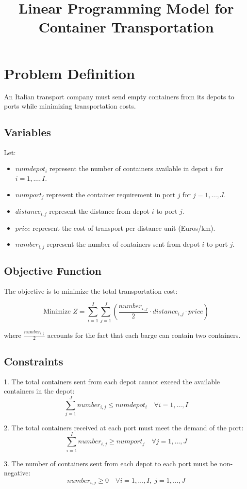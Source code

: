 \documentclass{article}
\begin{document}
\title{Linear Programming Model for Container Transportation}
\author{}
\date{}
\maketitle

\section*{Problem Definition}

An Italian transport company must send empty containers from its depots to ports while minimizing transportation costs. 

\subsection*{Variables}
Let:
\begin{itemize}
    \item \( numdepot_i \) represent the number of containers available in depot \( i \) for \( i = 1, \ldots, I \).
    \item \( numport_j \) represent the container requirement in port \( j \) for \( j = 1, \ldots, J \).
    \item \( distance_{i,j} \) represent the distance from depot \( i \) to port \( j \).
    \item \( price \) represent the cost of transport per distance unit (Euros/km).
    \item \( number_{i,j} \) represent the number of containers sent from depot \( i \) to port \( j \).
\end{itemize}

\subsection*{Objective Function}
The objective is to minimize the total transportation cost:

\[
\text{Minimize } Z = \sum_{i=1}^{I} \sum_{j=1}^{J} \left( \frac{number_{i,j}}{2} \cdot distance_{i,j} \cdot price \right)
\]

where \( \frac{number_{i,j}}{2} \) accounts for the fact that each barge can contain two containers.

\subsection*{Constraints}

1. The total containers sent from each depot cannot exceed the available containers in the depot:
\[
\sum_{j=1}^{J} number_{i,j} \leq numdepot_i \quad \forall i = 1, \ldots, I
\]

2. The total containers received at each port must meet the demand of the port:
\[
\sum_{i=1}^{I} number_{i,j} \geq numport_j \quad \forall j = 1, \ldots, J
\]

3. The number of containers sent from each depot to each port must be non-negative:
\[
number_{i,j} \geq 0 \quad \forall i = 1, \ldots, I, \; j = 1, \ldots, J
\]
\end{document}
